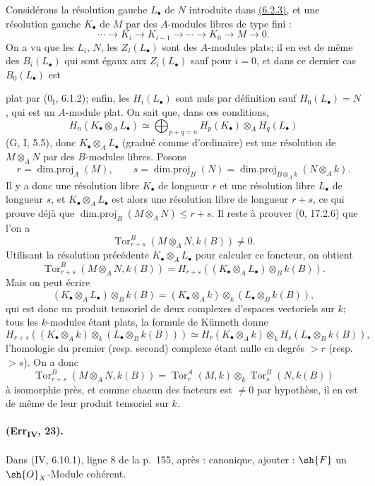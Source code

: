 Considérons la résolution gauche $L_\bullet$ de $N$ introduite dans
{\hyperlink{ega4.c04.prop.6-2-3}{(6.2.3)}}, et une résolution gauche
$K_\bullet$ de $M$ par des $A$-modules libres de type fini :
\[
 \cdots\longrightarrow K_i\longrightarrow K_{i-1}\longrightarrow
 \cdots\longrightarrow K_0\longrightarrow M\longrightarrow0.
\]
On a vu que les $L_i$, $N$, les $Z_i(L_\bullet)$ sont des $A$-modules
plats; il en est de même des $B_i(L_\bullet)$ qui sont égaux aux
$Z_i(L_\bullet)$ sauf pour $i=0$, et dans ce dernier cas
$B_0(L_\bullet)$ est

plat par ($0_{\mathrm I}$, 6.1.2); enfin, les $H_i(L_\bullet)$ sont nuls
par définition sauf $H_0(L_\bullet)=N$, qui est un $A$-module plat. On
sait que, dans ces conditions,
\[
 H_n(K_\bullet\otimes_AL_\bullet)\simeq
 \bigoplus_{p+q=n}
 H_p(K_\bullet)\otimes_AH_q(L_\bullet)
\]
(G, I, 5.5), donc $K_\bullet\otimes_AL_\bullet$ (gradué comme
d'ordinaire) est une résolution de $M\otimes_AN$ par des $B$-modules
libres. Posons
\[
 r=\operatorname{dim.proj}_A(M),\qquad
 s=\operatorname{dim.proj}_B(N)=
 \operatorname{dim.proj}_{B\otimes_Ak}(N\otimes_Ak).
\]
Il y a donc une résolution libre $K_\bullet$ de longueur $r$ et une
résolution libre $L_\bullet$ de longueur $s$, et
$K_\bullet\otimes_AL_\bullet$ est alors une résolution libre de longueur
$r+s$, ce qui prouve déjà que
$\operatorname{dim.proj}_B(M\otimes_AN)\leq r+s$. Il reste à prouver
($0$, 17.2.6) que l'on a
\[
 \operatorname{Tor}^{B}_{r+s}(M\otimes_AN,k(B))\neq0.
\]
Utilisant la résolution précédente $K_\bullet\otimes_AL_\bullet$ pour
calculer ce foncteur, on obtient
\[
 \operatorname{Tor}^{B}_{r+s}(M\otimes_AN,k(B))=
 H_{r+s}((K_\bullet\otimes_AL_\bullet)\otimes_Bk(B)).
\]
Mais on peut écrire
\[
 (K_\bullet\otimes_AL_\bullet)\otimes_Bk(B)=
 (K_\bullet\otimes_Ak)\otimes_k
 (L_\bullet\otimes_Bk(B)),
\]
qui est donc un produit tensoriel de deux complexes d'espaces
vectoriels sur $k$; tous les $k$-modules étant plats, la formule de
Künneth donne
\[
 H_{r+s}((K_\bullet\otimes_Ak)\otimes_k
 (L_\bullet\otimes_Bk(B)))\simeq
 H_r(K_\bullet\otimes_Ak)\otimes_k
 H_s(L_\bullet\otimes_Bk(B)),
\]
l'homologie du premier (resp. second) complexe étant nulle en degrés
$>r$ (resp. $>s$). On a donc
\[
 \operatorname{Tor}^{B}_{r+s}(M\otimes_AN,k(B))=
 \operatorname{Tor}^{A}_{r}(M,k)\otimes_k
 \operatorname{Tor}^{B}_{s}(N,k(B))
\]
à isomorphie près, et comme chacun des facteurs est $\neq0$ par
hypothèse, il en est de même de leur produit tensoriel sur $k$.

\paragraph{(Err\textsubscript{IV}, 23).}
Dans (IV, 6.10.1), ligne 8 de la p.~155, après : canonique, ajouter :
$\sh{F}$ un $\sh{O}_X$-Module cohérent.

